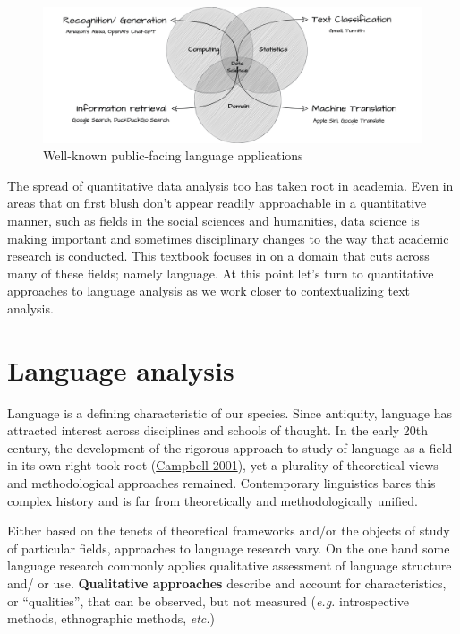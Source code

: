 \documentclass[
  letterpaper,
  DIV=11,
  numbers=noendperiod]{scrreport}
\theoremstyle{definition}
\theoremstyle{remark}
\begin{document}
\begin{figure}[H]

{\centering \includegraphics[width=1\textwidth,height=\textheight]{figures/text-analysis/ta-lang-venn.drawio.png}

}

\caption{\label{fig-intro-language-applications}Well-known public-facing
language applications}

\end{figure}

The spread of quantitative data analysis too has taken root in academia.
Even in areas that on first blush don't appear readily approachable in a
quantitative manner, such as fields in the social sciences and
humanities, data science is making important and sometimes disciplinary
changes to the way that academic research is conducted. This textbook
focuses in on a domain that cuts across many of these fields; namely
language. At this point let's turn to quantitative approaches to
language analysis as we work closer to contextualizing text analysis.

\hypertarget{language-analysis}{%
\section{Language analysis}\label{language-analysis}}

Language is a defining characteristic of our species. Since antiquity,
language has attracted interest across disciplines and schools of
thought. In the early 20th century, the development of the rigorous
approach to study of language as a field in its own right took root
(\protect\hyperlink{ref-Campbell2001}{Campbell 2001}), yet a plurality
of theoretical views and methodological approaches remained.
Contemporary linguistics bares this complex history and is far from
theoretically and methodologically unified.

Either based on the tenets of theoretical frameworks and/or the objects
of study of particular fields, approaches to language research vary. On
the one hand some language research commonly applies qualitative
assessment of language structure and/ or use. \textbf{Qualitative
approaches} describe and account for characteristics, or ``qualities'',
that can be observed, but not measured (\emph{e.g.} introspective
methods, ethnographic methods, \emph{etc.})
\end{document}
